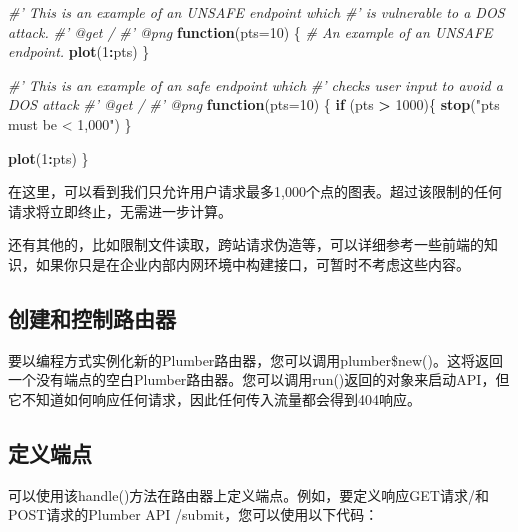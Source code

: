 \documentclass[]{book}
\newenvironment{Shaded}{\begin{snugshade}}{\end{snugshade}}
\newcommand{\KeywordTok}[1]{\textcolor[rgb]{0.13,0.29,0.53}{\textbf{#1}}}
\newcommand{\DataTypeTok}[1]{\textcolor[rgb]{0.13,0.29,0.53}{#1}}
\newcommand{\DecValTok}[1]{\textcolor[rgb]{0.00,0.00,0.81}{#1}}
\newcommand{\StringTok}[1]{\textcolor[rgb]{0.31,0.60,0.02}{#1}}
\newcommand{\CommentTok}[1]{\textcolor[rgb]{0.56,0.35,0.01}{\textit{#1}}}
\newcommand{\ControlFlowTok}[1]{\textcolor[rgb]{0.13,0.29,0.53}{\textbf{#1}}}
\newcommand{\OperatorTok}[1]{\textcolor[rgb]{0.81,0.36,0.00}{\textbf{#1}}}
\newcommand{\NormalTok}[1]{#1}
\begin{document}
\begin{Shaded}
\begin{Highlighting}[]
\CommentTok{#' This is an example of an UNSAFE endpoint which}
\CommentTok{#' is vulnerable to a DOS attack.}
\CommentTok{#' @get /}
\CommentTok{#' @png}
\ControlFlowTok{function}\NormalTok{(}\DataTypeTok{pts=}\DecValTok{10}\NormalTok{) \{}
  \CommentTok{# An example of an UNSAFE endpoint.}
  \KeywordTok{plot}\NormalTok{(}\DecValTok{1}\OperatorTok{:}\NormalTok{pts)}
\NormalTok{\}}
\end{Highlighting}
\end{Shaded}

\begin{Shaded}
\begin{Highlighting}[]
\CommentTok{#' This is an example of an safe endpoint which}
\CommentTok{#' checks user input to avoid a DOS attack}
\CommentTok{#' @get /}
\CommentTok{#' @png}
\ControlFlowTok{function}\NormalTok{(}\DataTypeTok{pts=}\DecValTok{10}\NormalTok{) \{}
  \ControlFlowTok{if}\NormalTok{ (pts }\OperatorTok{>}\StringTok{ }\DecValTok{1000}\NormalTok{)\{}
    \KeywordTok{stop}\NormalTok{(}\StringTok{"pts must be < 1,000"}\NormalTok{)}
\NormalTok{  \}}

  \KeywordTok{plot}\NormalTok{(}\DecValTok{1}\OperatorTok{:}\NormalTok{pts)}
\NormalTok{\}}
\end{Highlighting}
\end{Shaded}

在这里，可以看到我们只允许用户请求最多1,000个点的图表。超过该限制的任何请求将立即终止，无需进一步计算。

还有其他的，比如限制文件读取，跨站请求伪造等，可以详细参考一些前端的知识，如果你只是在企业内部内网环境中构建接口，可暂时不考虑这些内容。

\subsection{创建和控制路由器}

要以编程方式实例化新的Plumber路由器，您可以调用plumber\$new()。这将返回一个没有端点的空白Plumber路由器。您可以调用run()返回的对象来启动API，但它不知道如何响应任何请求，因此任何传入流量都会得到404响应。

\subsection{定义端点}

可以使用该handle()方法在路由器上定义端点。例如，要定义响应GET请求/和POST请求的Plumber
API /submit，您可以使用以下代码：
\end{document}
